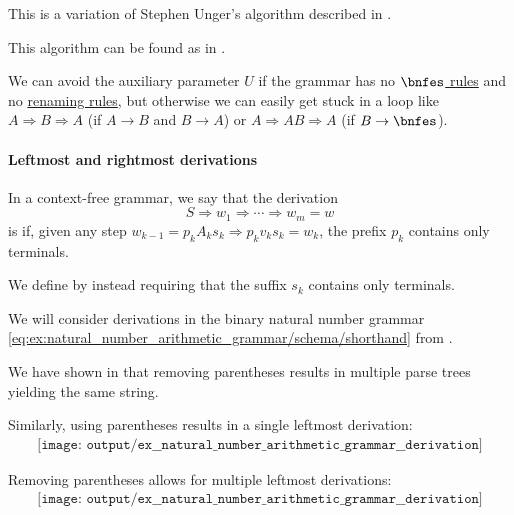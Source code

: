 \begin{comments}
  \item This is a variation of Stephen Unger's algorithm described in \cite{Unger1968}.
  \item This algorithm can be found as  in \cite{code}.
  \item We can avoid the auxiliary parameter \( U \) if the grammar has no \hyperref[def:epsilon_free_grammar]{\( \bnfes \) rules} and no \hyperref[def:renaming_rule]{renaming rules}, but otherwise we can easily get stuck in a loop like \( A \Rightarrow B \Rightarrow A \) (if \( A \to B \) and \( B \to A \)) or \( A \Rightarrow AB \Rightarrow A \) (if \( B \to \bnfes \)).
\end{comments}

\paragraph{Leftmost and rightmost derivations}

\begin{definition}\label{def:leftmost_derivation}
  In a context-free grammar, we say that the derivation
  \begin{equation*}
    S \Rightarrow w_1 \Rightarrow \cdots \Rightarrow w_m = w
  \end{equation*}
  is  if, given any step \( w_{k-1} = p_k A_k s_k \Rightarrow p_k v_k s_k = w_k \), the prefix \( p_k \) contains only terminals.

  We define  by instead requiring that the suffix \( s_k \) contains only terminals.
\end{definition}

\begin{example}\label{ex:natural_number_arithmetic_grammar/derivation}
  We will consider derivations in the binary natural number grammar \eqref{eq:ex:natural_number_arithmetic_grammar/schema/shorthand} from .

  We have shown in  that removing parentheses results in multiple parse trees yielding the same string.

  Similarly, using parentheses results in a single leftmost derivation:
  \begin{equation*}
    \begin{aligned}
      \texttt{[image: output/ex\_\_natural\_number\_arithmetic\_grammar\_\_derivation]}
    \end{aligned}
  \end{equation*}

  Removing parentheses allows for multiple leftmost derivations:
  \begin{equation*}
    \begin{aligned}
      \texttt{[image: output/ex\_\_natural\_number\_arithmetic\_grammar\_\_derivation]}
    \end{aligned}
  \end{equation*}
\end{example}

